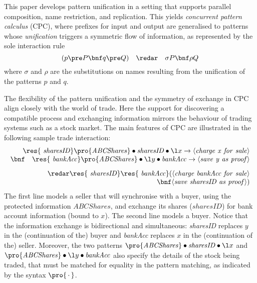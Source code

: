 \documentclass{LMCS}
\renewcommand{\rew}{\redar}
\newcommand{\xangle}[1]{\langle #1 \rangle}
\begin{document}
This paper develops pattern unification in a setting that supports
parallel composition, name restriction, and replication. This yields
{\em concurrent pattern calculus} (CPC), where prefixes for input and
output are generalised to patterns whose {\em unification} triggers a
symmetric flow of information, as represented by the sole interaction
rule
\[
(p\pre P \bnf q\pre Q) \quad \rew \quad \sigma P\bnf \rho Q
\]where $\sigma$ and $\rho$ are the substitutions on names resulting
from the unification of the patterns $p$ and $q$. 




The flexibility of the pattern unification and the symmetry of exchange 
in CPC align closely with the world of trade. Here the support for 
discovering a compatible process and exchanging information mirrors 
the behaviour of trading systems such as a stock market.
The main features of CPC are illustrated in the following sample trade interaction:
\[
\begin{array}{r}
\res{\mathit{\ sharesID}}\pro{\mathit{ABCShares}}\bullet\mathit{sharesID}\bullet\l x
\to \xangle{\mathit{charge\ x\ for\ sale}}
\\ \bnf \quad
\res{\mathit{\ bankAcc}}\pro{\mathit{ABCShares}}\bullet\l y\bullet\mathit{bankAcc}
\to \xangle{\mathit{save\ y\ as\ proof}}
\vspace*{.3cm}
\\
\redar
\res{\mathit{\ sharesID}}\res{\mathit{\ bankAcc}}
(\xangle{\mathit{charge\ bankAcc\ for\ sale}}\\
\bnf \xangle{\mathit{save\ sharesID\ as\ proof}})
\end{array}
\]
The first line models a seller that will synchronise with a buyer, using the protected
information $\mathit{ABCShares}$, and exchange its shares ($\mathit{sharesID}$) for bank
account information (bound to $x$).
The second line models a buyer. Notice that the information exchange is bidirectional
and simultaneous: {\it sharesID} replaces $y$ in the (continuation of the) buyer and
{\it bankAcc} replaces $x$ in the (continuation of the) seller.
Moreover, the two patterns $\pro{\mathit{ABCShares}}\bullet\mathit{sharesID}\bullet\l x$
and $\pro{\mathit{ABCShares}}\bullet\l y\bullet\mathit{bankAcc}$ also specify the
details of the stock being traded, that must be matched for equality in the pattern
matching, as indicated by the syntax $\pro {\,\cdot\,}$.
\end{document}
